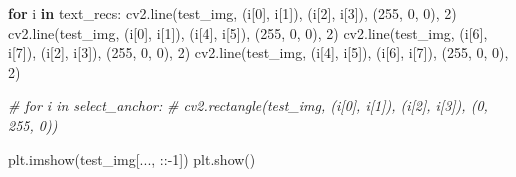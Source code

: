 \documentclass[11pt]{article}
\newenvironment{Shaded}{}{}
\newcommand{\KeywordTok}[1]{\textcolor[rgb]{0.00,0.44,0.13}{\textbf{{#1}}}}
\newcommand{\DecValTok}[1]{\textcolor[rgb]{0.25,0.63,0.44}{{#1}}}
\newcommand{\CommentTok}[1]{\textcolor[rgb]{0.38,0.63,0.69}{\textit{{#1}}}}
\newcommand{\NormalTok}[1]{{#1}}
\newcommand{\ControlFlowTok}[1]{\textcolor[rgb]{0.00,0.44,0.13}{\textbf{{#1}}}}
\newcommand{\OperatorTok}[1]{\textcolor[rgb]{0.40,0.40,0.40}{{#1}}}
\begin{document}
\begin{Shaded}
\begin{Highlighting}[]
\ControlFlowTok{for}\NormalTok{ i }\KeywordTok{in}\NormalTok{ text_recs:}
\NormalTok{    cv2.line(test_img, (i[}\DecValTok{0}\NormalTok{], i[}\DecValTok{1}\NormalTok{]), (i[}\DecValTok{2}\NormalTok{], i[}\DecValTok{3}\NormalTok{]), (}\DecValTok{255}\NormalTok{, }\DecValTok{0}\NormalTok{, }\DecValTok{0}\NormalTok{), }\DecValTok{2}\NormalTok{)}
\NormalTok{    cv2.line(test_img, (i[}\DecValTok{0}\NormalTok{], i[}\DecValTok{1}\NormalTok{]), (i[}\DecValTok{4}\NormalTok{], i[}\DecValTok{5}\NormalTok{]), (}\DecValTok{255}\NormalTok{, }\DecValTok{0}\NormalTok{, }\DecValTok{0}\NormalTok{), }\DecValTok{2}\NormalTok{)}
\NormalTok{    cv2.line(test_img, (i[}\DecValTok{6}\NormalTok{], i[}\DecValTok{7}\NormalTok{]), (i[}\DecValTok{2}\NormalTok{], i[}\DecValTok{3}\NormalTok{]), (}\DecValTok{255}\NormalTok{, }\DecValTok{0}\NormalTok{, }\DecValTok{0}\NormalTok{), }\DecValTok{2}\NormalTok{)}
\NormalTok{    cv2.line(test_img, (i[}\DecValTok{4}\NormalTok{], i[}\DecValTok{5}\NormalTok{]), (i[}\DecValTok{6}\NormalTok{], i[}\DecValTok{7}\NormalTok{]), (}\DecValTok{255}\NormalTok{, }\DecValTok{0}\NormalTok{, }\DecValTok{0}\NormalTok{), }\DecValTok{2}\NormalTok{)}

\CommentTok{# for i in select_anchor:}
\CommentTok{#     cv2.rectangle(test_img, (i[0], i[1]), (i[2], i[3]), (0, 255, 0))}

\NormalTok{plt.imshow(test_img[..., ::}\OperatorTok{-}\DecValTok{1}\NormalTok{])}
\NormalTok{plt.show()}
\end{Highlighting}
\end{Shaded}


    
    
    
    
\end{document}
